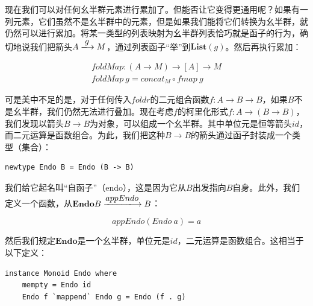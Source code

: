 \documentclass[b5paper]{ctexart}
\begin{document}
现在我们可以对任何幺半群元素进行累加了。但能否让它变得更通用呢？如果有一列元素，它们虽然不是幺半群中的元素，但是如果我们能将它们转换为幺半群，就仍然可以进行累加。将某一类型的列表映射为幺半群列表恰巧就是函子的行为，确切地说我们把箭头$A \arrowto{g} M$，通过列表函子“举”到$\mathbf{List}(g)$。然后再执行累加：

\begin{center}
\end{center}

\[
\begin{array}{l}
foldMap : (A \to M) \to [A] \to M \\
foldMap\ g = concat_M \circ fmap\ g
\end{array}
\]

可是美中不足的是，对于任何传入$foldr$的二元组合函数$f : A \to B \to B$，如果$B$不是幺半群，我们仍然无法进行叠加。现在考虑$f$的柯里化形式$f : A \to (B \to B)$，我们发现以箭头$B \to B$为对象，可以组成一个幺半群。其中单位元是恒等箭头$id$，而二元运算是函数组合。为此，我们把这种$B \to B$的箭头通过函子封装成一个类型（集合）：

\lstset{frame=none}
\begin{lstlisting}[style=Haskell]
newtype Endo B = Endo (B -> B)
\end{lstlisting}

我们给它起名叫“自函子”（endo），这是因为它从$B$出发指向$B$自身。此外，我们定义一个函数，从$\mathbf{Endo}B \arrowto{appEndo} B$：

\[
appEndo(Endo\ a) = a
\]

然后我们规定$\mathbf{Endo}$是一个幺半群，单位元是$id$，二元运算是函数组合。这相当于以下定义：

\lstset{frame=single}
\begin{lstlisting}[style=Haskell]
instance Monoid Endo where
    mempty = Endo id
    Endo f `mappend` Endo g = Endo (f . g)
\end{lstlisting}
\end{document}
